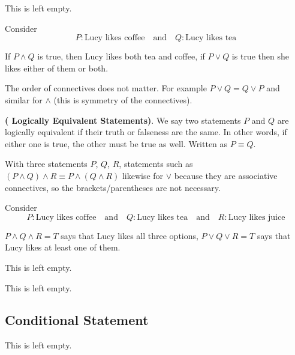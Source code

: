 \begin{remark}
    This is left empty.
\end{remark}

\begin{example}
    Consider
    $$
    P: \text{Lucy likes coffee} \quad \text{and} \quad Q: \text{Lucy likes tea}
    $$

    If $P \land Q$ is true, then Lucy likes both tea and coffee, if $P \lor Q$ is true then she likes either of them or both.
\end{example}

The order of connectives does not matter. For example $P \lor Q = Q \lor P$ and similar for $\land$ (this is symmetry of the connectives).

\begin{definition} \textbf{( Logically Equivalent Statements)}. We say two statements $P$ and $Q$ are logically equivalent if their truth or falseness are the same. In other words, if either one is true, the other must be true as well. Written as $P \equiv Q$.
\end{definition}

With three statements $P$, $Q$, $R$, statements such as $(P \land Q) \land R \equiv P \land (Q \land R)$ likewise for $\lor$ because they are associative connectives, so the brackets/parentheses are not necessary.

\begin{example}
    Consider
    $$
    P: \text{Lucy likes coffee} \quad \text{and} \quad Q: \text{Lucy likes tea} \quad \text{and} \quad R: \text{Lucy likes juice}
    $$

    $P \land Q \land R = T$ says that Lucy likes all three options, $P \lor Q \lor R = T$ says that Lucy likes at least one of them.
\end{example}

\begin{example}
    This is left empty.
\end{example}

\begin{example}
    This is left empty.
\end{example}

\subsection{Conditional Statement}

\begin{remark}
    This is left empty.
\end{remark}

